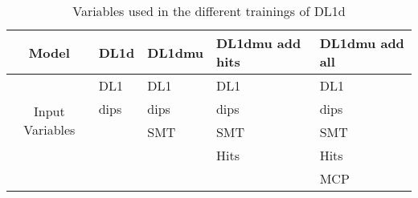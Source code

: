 \begin{table}[]
  \caption{Variables used in the different trainings of DL1d}%
  \label{tab:DL1dModels}
  \centering

  \begin{tabular}{c| llll
    }
    \hline
    Model                            & DL1d & DL1dmu & DL1dmu add hits & DL1dmu add all \\
    \hline
    \multirow{4}{*}{Input Variables} & DL1  & DL1    & DL1             & DL1            \\
                                     & dips & dips   & dips            & dips           \\
                                     &      & SMT    & SMT             & SMT            \\
                                     &      &        & Hits            & Hits           \\
                                     &      &        &                 & MCP            \\
    \hline
  \end{tabular}
\end{table}


